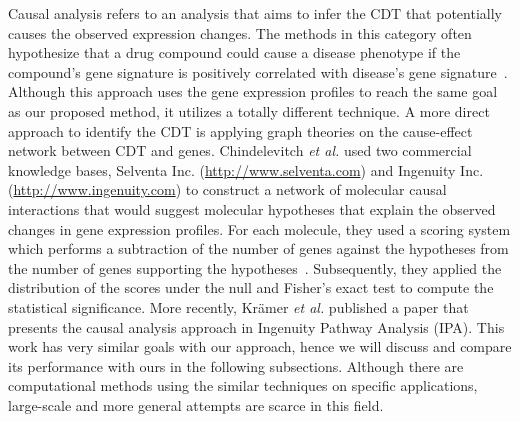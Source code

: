 Causal analysis refers to an analysis that aims to infer the CDT that potentially causes the observed expression changes. The methods in this category often hypothesize that a drug compound could cause a disease phenotype if the compound's gene signature is positively correlated with disease's gene signature~\cite{huang2013inferring}. Although this approach uses the gene expression profiles to reach the same goal as our proposed method, it utilizes a totally different technique. A more direct approach to identify the CDT is applying graph theories on the cause-effect network between CDT and genes. Chindelevitch \textit{et al.} used two commercial knowledge bases, Selventa Inc. (\href{http://www.selventa.com}{http://www.selventa.com}) and Ingenuity Inc. (\href{http://www.ingenuity.com}{http://www.ingenuity.com}) to construct a network of molecular causal interactions  that would suggest molecular hypotheses that explain the observed changes in gene expression profiles. For each molecule, they used a scoring system which performs a subtraction of  the number of genes against the hypotheses from the number of genes supporting the hypotheses~\cite{chindelevitch2012causal}. Subsequently, they applied the distribution of the scores under the null and Fisher's exact test to compute the statistical significance. More recently, Kr{\"a}mer \textit{et al.} published a paper that presents the causal analysis approach in Ingenuity Pathway Analysis (IPA). This work has very similar goals with our approach, hence we will discuss and compare its performance with ours in the following subsections. Although there are computational methods using the similar techniques on specific applications, %
large-scale and more general attempts are scarce in this field.




